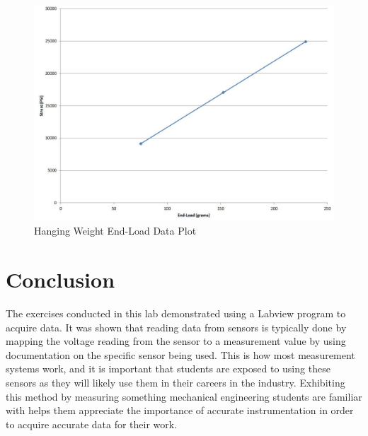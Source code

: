 \documentclass[12pt]{article}
\begin{document}
\begin{figure}[h!] %
   \centering
   \includegraphics[width=5.5in]{hanging_weight_plot.jpg} 
   \caption{Hanging Weight End-Load Data Plot}
   \label{fig:example}
\end{figure}


\section*{\fontsize{12}{12}\selectfont \large Conclusion}
The exercises conducted in this lab demonstrated using a Labview program to acquire data. It was shown that reading data from sensors is typically done by mapping the voltage reading from the sensor to a measurement value by using documentation on the specific sensor being used. This is how most measurement systems work, and it is important that students are exposed to using these sensors as they will likely use them in their careers in the industry. Exhibiting this method by measuring something mechanical engineering students are familiar with helps them appreciate the importance of accurate instrumentation in order to acquire accurate data for their work.



%
%




\end{document}
